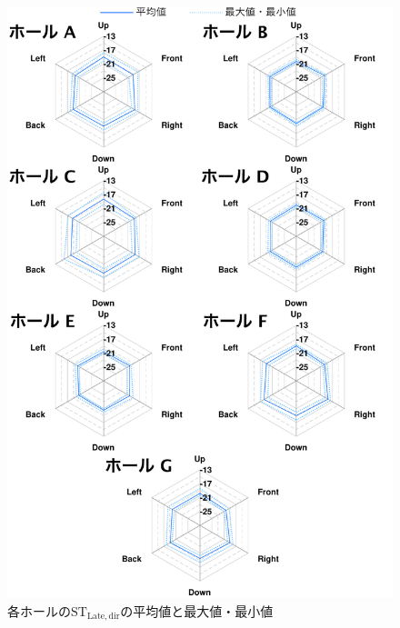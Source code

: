 \documentclass[11pt,a4j]{jreport}
\begin{document}
\newpage
{}
\begin{figure}[H]
  \centering
  \includegraphics[scale=.8]{images/realHallDirSt/realHallOverall/eachHallLate.pdf}
  \caption{各ホールの$\mathrm{ST_{Late,dir}}$の平均値と最大値・最小値}
  \label{fig:各ホールのSTLateの平均値と最大値・最小値}
\end{figure}

\end{document}
